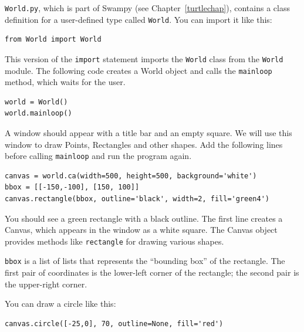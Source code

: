 \documentclass[10pt]{book}
\begin{document}
\begin{ex}
\label{canvas}


{\tt World.py}, which is part of Swampy (see Chapter~\ref{turtlechap}),
contains a class definition for a user-defined type called 
{\tt World}.  You can import it like this:

\beforeverb
\begin{verbatim}
from World import World
\end{verbatim}
\afterverb

This version of the {\tt import} statement imports the {\tt World}
class from the {\tt World} module.
The following code creates a World object and calls
the {\tt mainloop} method, which
waits for
the user.

\beforeverb
\begin{verbatim}
world = World()
world.mainloop()
\end{verbatim}
\afterverb

A window should appear with a title bar and an empty square.
We will use this window to draw Points,
Rectangles and other shapes.  
Add the following lines before calling
\verb"mainloop" and run the program again.


\beforeverb
\begin{verbatim}
canvas = world.ca(width=500, height=500, background='white')
bbox = [[-150,-100], [150, 100]]
canvas.rectangle(bbox, outline='black', width=2, fill='green4')
\end{verbatim}
\afterverb

You should see a green rectangle with a black outline.
The first line creates a Canvas, which appears in the window
as a white square.  The Canvas object provides methods like
{\tt rectangle} for drawing various shapes.


{\tt bbox} is a list of lists that represents the ``bounding box''
of the rectangle.  The first pair of coordinates is the lower-left
corner of the rectangle; the second pair is the upper-right corner.

You can draw a circle like this:

\beforeverb
\begin{verbatim}
canvas.circle([-25,0], 70, outline=None, fill='red')
\end{verbatim}
\afterverb


\end{ex}
\end{document}
